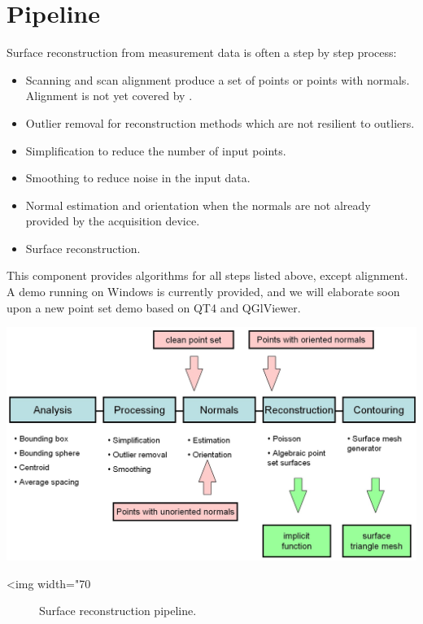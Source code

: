 \section{Pipeline}

Surface reconstruction from measurement data is often a step by step process:

\begin{itemize}
\item Scanning and scan alignment produce a set of points
      or points with normals. Alignment is not yet
      covered by \cgal.
\item Outlier removal for reconstruction methods which
      are not resilient to outliers.
\item Simplification to reduce the number of input points.
\item Smoothing to reduce noise in the input data.
\item Normal estimation and orientation when the normals
      are not already provided by the acquisition device.
\item Surface reconstruction.
\end{itemize}

This component provides algorithms for all steps listed above, except alignment.
A demo running on Windows is currently provided, and we will elaborate soon upon a new point set demo based on QT4 and QGlViewer.

\begin{center}
    \label{Surface_reconstruction_3-fig-pipeline}
    \begin{ccTexOnly}
        \includegraphics[width=1.0\textwidth]{Surface_reconstruction_3/pipeline} %
    \end{ccTexOnly}
    \begin{ccHtmlOnly}
        <img width="70%
    \end{ccHtmlOnly}
    \begin{figure}[h]
        \caption{Surface reconstruction pipeline.}
    \end{figure}
\end{center}


